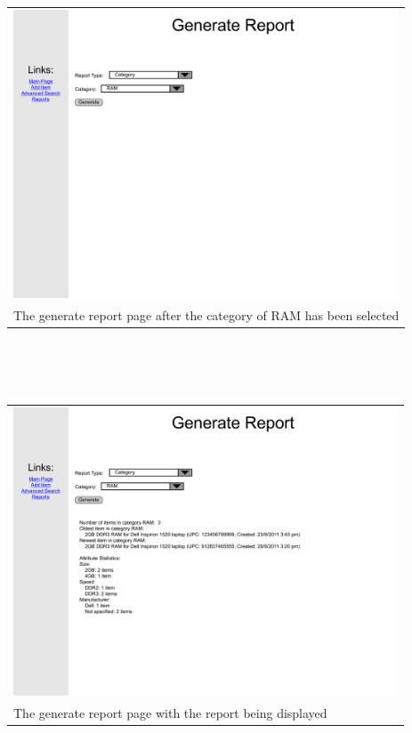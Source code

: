 \documentclass{article}
\begin{document}
\begin{tabular}{ p{4.5in} }
\includegraphics[keepaspectratio, width=4.5in]{generateReportF0S3.pdf} \\
The generate report page after the category of RAM has been selected
\end{tabular}\\
~\\
~\\
\begin{tabular}{ p{4.5in} }
\includegraphics[keepaspectratio, width=4.5in]{generateReportF0S4.pdf} \\
The generate report page with the report being displayed
\end{tabular}
\end{document}
